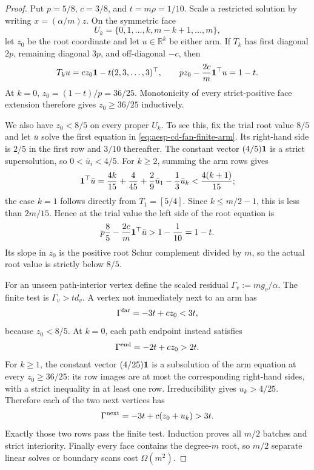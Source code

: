 \begin{proof}
Put \(p=5/8\), \(c=3/8\), and \(t=m\rho=1/10\).  Scale a restricted
solution by writing \(x=(\alpha/m)z\).  On the symmetric face
\begin{equation*}
 U_k=\{0,1,\ldots,k,m-k+1,\ldots,m\},
\end{equation*}
let \(z_0\) be the root coordinate and let \(u\in\mathbb R^k\) be either
arm.  If \(T_k\) has first diagonal \(2p\), remaining diagonal \(3p\), and
off-diagonal \(-c\), then
\begin{equation}
 T_ku=cz_0\mathbf{1}-t(2,3,\ldots,3)^\top,
 \qquad
 pz_0-\frac{2c}{m}\mathbf{1}^\top u=1-t.
 \label{eq:aesp-cd-fan-finite-arm}
\end{equation}
At \(k=0\), \(z_0=(1-t)/p=36/25\).  Monotonicity of every strict-positive
face extension therefore gives \(z_0\geq36/25\) inductively.

We also have \(z_0<8/5\) on every proper \(U_k\).  To see this, fix the
trial root value \(8/5\) and let \(\bar u\) solve the first equation in
\cref{eq:aesp-cd-fan-finite-arm}.  Its right-hand side is \(2/5\) in the
first row and \(3/10\) thereafter.  The constant vector \((4/5)\mathbf{1}\) is a
strict supersolution, so \(0<\bar u_i<4/5\).  For \(k\geq2\), summing the
arm rows gives
\begin{equation*}
 \mathbf{1}^\top\bar u
 =\frac{4k}{15}+\frac4{45}+\frac2{9}\bar u_1
   -\frac13\bar u_k
 <\frac{4(k+1)}{15};
\end{equation*}
the case \(k=1\) follows directly from \(T_1=[5/4]\).  Since
\(k\leq m/2-1\), this is less than \(2m/15\).  Hence at the trial value the
left side of the root equation is
\begin{equation*}
 p\frac85-\frac{2c}{m}\mathbf{1}^\top\bar u
 >1-\frac1{10}=1-t.
\end{equation*}
Its slope in \(z_0\) is the positive root Schur complement divided by \(m\),
so the actual root value is strictly below \(8/5\).

For an unseen path-interior vertex define the scaled residual
\(\Gamma_v:=m g_v/\alpha\).  The finite test is
\(\Gamma_v>t d_v\).  A vertex not immediately next to an arm has
\begin{equation*}
 \Gamma^{\rm far}=-3t+cz_0<3t,
\end{equation*}
because \(z_0<8/5\).  At \(k=0\), each path endpoint instead satisfies
\begin{equation*}
 \Gamma^{\rm end}=-2t+cz_0>2t.
\end{equation*}
For \(k\geq1\), the constant vector \((4/25)\mathbf{1}\) is a subsolution of the
arm equation at every \(z_0\geq36/25\): its row images are at most the
corresponding right-hand sides, with a strict inequality in at least one
row.  Irreducibility gives \(u_k>4/25\).  Therefore each of the two next
vertices has
\begin{equation*}
 \Gamma^{\rm next}=-3t+c(z_0+u_k)>3t.
\end{equation*}
Exactly those two rows pass the finite test.  Induction proves all \(m/2\)
batches and strict interiority.  Finally every face contains the degree-\(m\)
root, so \(m/2\) separate linear solves or boundary scans cost
\(\Omega(m^2)\).
\end{proof}

